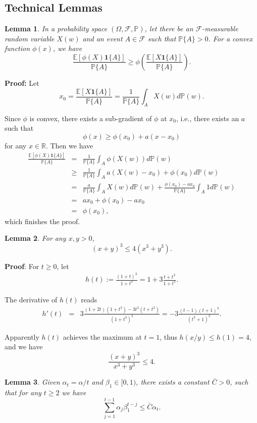 \documentclass[twoside]{article}
\def\RR{\mathbb{R}}
\def\EE{\mathbb{E}}
\def\PP{\mathbb{P}}
\def\FF{\mathcal{F}}
\newtheorem{lemma}{Lemma}
\begin{document}
\subsection{Technical Lemmas}
\begin{lemma}
\label{lem:Jensen}
In a probability space $(\Omega, \FF, \PP)$, let there be an $\FF$-measurable random variable $X(w)$ and an event $A\in\FF$ such that $\PP\{A\}>0$. For a convex function $\phi(x)$, we have
$$\frac{\EE \left[ \phi(X)\mathbf{1}\{A\}\right]}{\PP\{A\}}\geq  \phi\left( \frac{\EE\left[X \mathbf{1}\{A\}\right]}{\PP\{A\}} \right).$$
\end{lemma}

\textbf{Proof:}
Let 
$$x_0 = \frac{\EE\left[X\mathbf{1}\{A\}\right]}{\PP\{A\}} = \frac{1}{\PP\{A\}}\int_A X(w) d\PP(w).$$

Since $\phi$ is convex, there exists a sub-gradient of $\phi$ at $x_0$, i.e., there exists an $a$ such that
$$\phi(x) \geq \phi(x_0) + a(x-x_0)$$
for any $x\in\RR$. Then we have
\begin{eqnarray}
\frac{\EE\left[\phi(X) \mathbf{1}\{A\}\right]}{\PP\{A\}} &=& \frac{1}{\PP\{A\}}\int_A \phi(X(w))d\PP(w) \nonumber\\
&\geq& \frac{1}{\PP\{A\}}\int_A a (X(w) - x_0) + \phi(x_0) d\PP(w) \nonumber\\
&=& \frac{a}{\PP\{A\}} \int_A X(w) d\PP(w) + \frac{\phi(x_0) - ax_0}{\PP\{A\}} \int_A 1d\PP(w)\nonumber\\
&=& ax_0 +\phi(x_0) - ax_0\nonumber \\
&=& \phi(x_0)\nonumber,
\end{eqnarray}
which finishes the proof.

\begin{lemma}
\label{lem:simplecalculus}
For any $x,y >0$, 
$$(x+y)^{3} \leq 4(x^3 + y^3).$$
\end{lemma}

\textbf{Proof}:
For $t\geq 0$, let
\begin{eqnarray}
h(t):=\frac{(1+t)^3}{1+t^3} = 1 + 3 \frac{t + t^2}{1 + t^3}.\nonumber
\end{eqnarray}

The derivative of $h(t)$ reads
\begin{eqnarray}
h'(t) &=& 3\frac{(1+2t)(1+t^3) - 3t^2(t+t^2)}{(1+t^3)^2} = -3\frac{(t-1)(t+1)^3}{(t^3+1)^2}.\nonumber
\end{eqnarray}

Apparently $h(t)$ achieves the maximum at $t=1$, thus $h(x/y)\leq h(1)=4$, and we have
\begin{equation*}
    \frac{(x+y)^3}{x^3 + y^3}\leq 4.
\end{equation*}
\newpage
\begin{lemma}
\label{lem:sumbetaalpha}
Given $\alpha_t = \alpha/t$ and $\beta_1\in[0,1)$, there exists a constant $\bar C>0$, such that for any $t\geq 2$ we have 
$$\sum_{j=1}^{t-1}\alpha_j \beta_1^{t-j}\leq \bar C\alpha_t .$$
\end{lemma}
\end{document}
